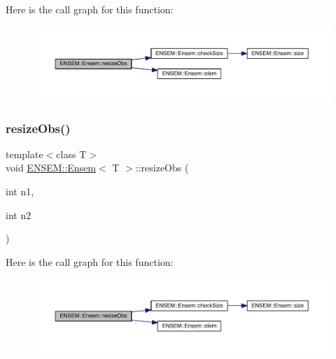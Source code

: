 Here is the call graph for this function\+:
\nopagebreak
\begin{figure}[H]
\begin{center}
\leavevmode
\includegraphics[width=350pt]{d7/d3e/classENSEM_1_1Ensem_af74074307267e421a53a3e9e9e2449fc_cgraph}
\end{center}
\end{figure}
\mbox{\label{classENSEM_1_1Ensem_af74074307267e421a53a3e9e9e2449fc}} 
\subsubsection{\texorpdfstring{resizeObs()}{resizeObs()}\hspace{0.1cm}{\footnotesize\ttfamily [6/12]}}
{\footnotesize\ttfamily template$<$class T$>$ \\
void \mbox{\hyperlink{classENSEM_1_1Ensem}{E\+N\+S\+E\+M\+::\+Ensem}}$<$ T $>$\+::resize\+Obs (\begin{DoxyParamCaption}\item[{int}]{n1,  }\item[{int}]{n2 }\end{DoxyParamCaption})\hspace{0.3cm}{\ttfamily [inline]}}

Here is the call graph for this function\+:
\nopagebreak
\begin{figure}[H]
\begin{center}
\leavevmode
\includegraphics[width=350pt]{d7/d3e/classENSEM_1_1Ensem_af74074307267e421a53a3e9e9e2449fc_cgraph}
\end{center}
\end{figure}
\mbox{\label{classENSEM_1_1Ensem_a8d63351cad23f2af13f26c7326d1abcf}} 
